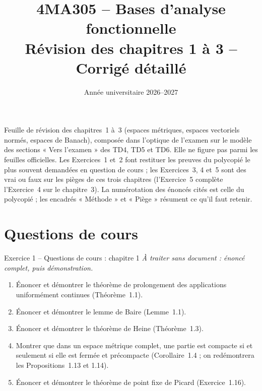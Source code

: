 \documentclass[11pt,a4paper]{article}
\title{\textbf{4MA305 -- Bases d'analyse fonctionnelle}\\[2mm]
\Large Révision des chapitres 1 à 3 -- Corrigé détaillé}
\author{}
\date{Année universitaire 2026--2027}
\theoremstyle{definition}
\begin{document}
\maketitle

\begin{commentaire}
Feuille de révision des chapitres~1 à~3 (espaces métriques, espaces vectoriels normés, espaces de Banach), composée dans l'optique de l'examen sur le modèle des sections « Vers l'examen » des TD4, TD5 et TD6. Elle ne figure pas parmi les feuilles officielles. Les Exercices~1 et~2 font restituer les preuves du polycopié le plus souvent demandées en question de cours ; les Exercices~3, 4 et~5 sont des vrai ou faux sur les pièges de ces trois chapitres (l'Exercice~5 complète l'Exercice~4 sur le chapitre~3). La numérotation des énoncés cités est celle du polycopié ; les encadrés « Méthode » et « Piège » résument ce qu'il faut retenir.
\end{commentaire}

\section*{Questions de cours}

\begin{exo}{Exercice 1 -- Questions de cours : chapitre 1}
\emph{À traiter sans document : énoncé complet, puis démonstration.}
\begin{enumerate}[label=(\alph*)]
  \item Énoncer et démontrer le théorème de prolongement des applications uniformément continues (Théorème~1.1).
  \item Énoncer et démontrer le lemme de Baire (Lemme~1.1).
  \item Énoncer et démontrer le théorème de Heine (Théorème~1.3).
  \item Montrer que dans un espace métrique complet, une partie est compacte si et seulement si elle est fermée et précompacte (Corollaire~1.4 ; on redémontrera les Propositions~1.13 et 1.14).
  \item Énoncer et démontrer le théorème de point fixe de Picard (Exercice~1.16).
\end{enumerate}
\end{exo}
\end{document}
